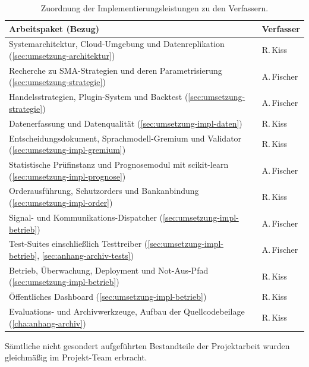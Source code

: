 \begin{table}[htbp]
  \centering
  \small
  \caption[Beitragszuordnung der Verfasser]{Zuordnung der
    Implementierungsleistungen zu den Verfassern.\quelleeigen}
  \label{tab:anhang-beitraege}
  \begin{tabular}{p{8.6cm} l}
    \toprule
    Arbeitspaket (Bezug) & Verfasser \\
    \midrule
    Systemarchitektur, Cloud-Umgebung und Datenreplikation
    (\cref{sec:umsetzung-architektur}) & R.\,Kiss \\
    Recherche zu SMA-Strategien und deren Parametrisierung
    (\cref{sec:umsetzung-strategie}) & A.\,Fischer \\
    Handelsstrategien, Plugin-System und Backtest
    (\cref{sec:umsetzung-strategie}) & A.\,Fischer \\
    Datenerfassung und Datenqualität (\cref{sec:umsetzung-impl-daten}) & R.\,Kiss \\
    Entscheidungsdokument, Sprachmodell-Gremium und Validator
    (\cref{sec:umsetzung-impl-gremium}) & R.\,Kiss \\
    Statistische Prüfinstanz und Prognosemodul mit scikit-learn
    (\cref{sec:umsetzung-impl-prognose}) & A.\,Fischer \\
    Orderausführung, Schutzorders und Bankanbindung
    (\cref{sec:umsetzung-impl-order}) & R.\,Kiss \\
    Signal- und Kommunikations-Dispatcher
    (\cref{sec:umsetzung-impl-betrieb}) & A.\,Fischer \\
    Test-Suites einschließlich Testtreiber
    (\cref{sec:umsetzung-impl-betrieb}, \cref{sec:anhang-archiv-tests}) & A.\,Fischer \\
    Betrieb, Überwachung, Deployment und Not-Aus-Pfad
    (\cref{sec:umsetzung-impl-betrieb}) & R.\,Kiss \\
    Öffentliches Dashboard (\cref{sec:umsetzung-impl-betrieb}) & R.\,Kiss \\
    Evaluations- und Archivwerkzeuge, Aufbau der Quellcodebeilage
    (\cref{cha:anhang-archiv}) & R.\,Kiss \\
    \bottomrule
  \end{tabular}
\end{table}

Sämtliche nicht gesondert aufgeführten Bestandteile der Projektarbeit wurden
gleichmäßig im Projekt-Team erbracht.

